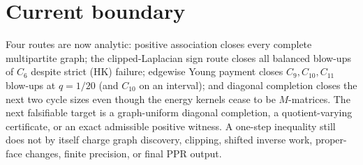 \section{Current boundary}

Four routes are now analytic: positive association closes every complete
multipartite graph; the clipped-Laplacian sign route closes all balanced
blow-ups of $C_6$ despite strict \textup{(HK)} failure; edgewise Young
payment closes $C_{9},C_{10},C_{11}$ blow-ups at $q=1/20$ (and $C_{10}$ on
an interval); and diagonal completion closes the next two cycle sizes even
though the energy kernels cease to be $M$-matrices.  The next falsifiable
target is a graph-uniform diagonal completion, a quotient-varying
certificate, or an exact admissible positive witness.  A one-step inequality
still does not by itself charge graph discovery, clipping, shifted inverse
work, proper-face changes, finite precision, or final PPR output.
